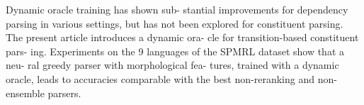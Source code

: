 Dynamic oracle training has shown sub- stantial improvements for dependency parsing in various settings, but has not been explored for constituent parsing. The present article introduces a dynamic ora- cle for transition-based constituent pars- ing. Experiments on the 9 languages of the SPMRL dataset show that a neu- ral greedy parser with morphological fea- tures, trained with a dynamic oracle, leads to accuracies comparable with the best non-reranking and non-ensemble parsers.
